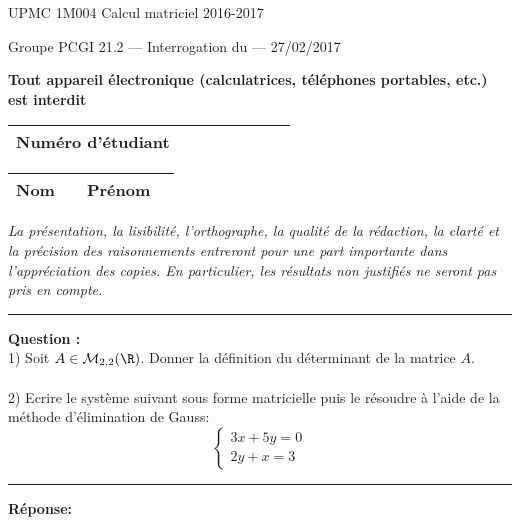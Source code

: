 \documentclass[11pt]{article}
\begin{document}
{\large UPMC \hfill 1M004 Calcul matriciel \hfill 2016-2017}

\vskip -3mm
\noindent \textbf{\hrulefill}

\vskip 1mm

\centerline{
{\large Groupe PCGI 21.2 \hspace{1.7 cm} --- Interrogation du --- \hspace{3.5 cm}  27/02/2017}}


\vskip -2mm
\noindent \textbf{\hrulefill}



\vskip 2mm

\centerline{\textbf{Tout appareil \'electronique (calculatrices, t\'el\'ephones portables, etc.) est interdit}}

\vskip 2mm
{\LARGE
\begin{center}
\begin{tabular}{|p{7cm}|p{1cm}|p{1cm}|p{1cm}|p{1cm}|p{1cm}|p{1cm}|p{1cm}|}
\hline
\textbf{Num\'ero d'\'etudiant} &     & & & & &   &
\\
\hline
\end{tabular}

\vskip 0.25cm

\begin{tabular}{|p{2cm}|p{6cm}|p{3cm}|p{5cm}|}
\hline
\textbf{Nom} &     & \textbf{Pr\'enom   }  &   \\
\hline
\end{tabular}
\end{center}
} %


{\sl  La pr\'esentation, la lisibilit\'e, l'orthographe, la
 qualit\'e de la r\'edaction, la clart\'e et la pr\'ecision des
 raisonnements entreront pour une part importante dans
 l'appr\'eciation des copies. En particulier, les r\'esultats non
 justifi\'es ne seront pas pris en compte. }


\vskip 3mm
\hrule

\vskip 3mm
\noindent \textbf{Question :}\\
1) Soit $A \in \mathcal{M}_{2,2}(\R)$. Donner la définition du déterminant de la matrice  $A$.\\\\
2) Ecrire le système suivant sous forme matricielle puis le résoudre à l'aide de la méthode d'élimination de Gauss:
\begin{equation*}
\left\lbrace\begin{array}{llccc}
3x + 5 y = 0 \\
2y + x = 3
\end{array}
\right.
\end{equation*}


\kern\medskipamount

\hrule

\vskip 3mm


\noindent \textbf{Réponse:}\\

\newpage
\end{document}
